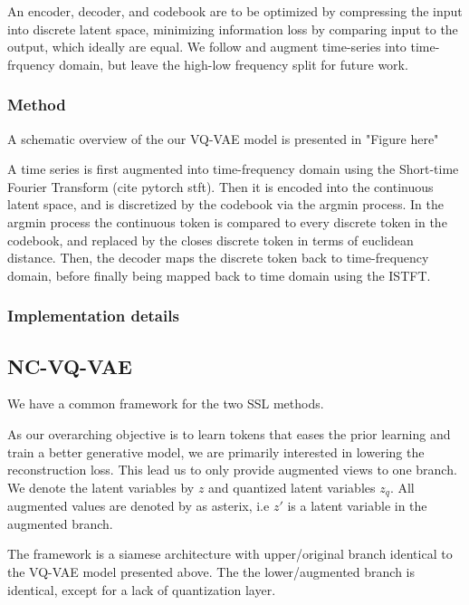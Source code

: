 \documentclass[../../thesis.tex]{subfiles}
\begin{document}
An encoder, decoder, and codebook are to be optimized by compressing the input into discrete latent space, minimizing information loss by comparing input to the output, which ideally are equal. We follow \cite{TimeVQVAE} and augment time-series into time-frquency domain, but leave the high-low frequency split for future work.

\subsubsection{Method}
A schematic overview of the our VQ-VAE model is presented in "Figure here"\newline

A time series is first augmented into time-frequency domain using the Short-time Fourier Transform (cite pytorch stft). Then it is encoded into the continuous latent space, and is discretized by the codebook via the argmin process. In the argmin process the continuous token is compared to every discrete token in the codebook, and replaced by the closes discrete token in terms of euclidean distance. Then, the decoder maps the discrete token back to time-frequency domain, before finally being mapped back to time domain using the ISTFT.




\subsubsection{Implementation details}


\subsection{NC-VQ-VAE}
We have a common framework for the two SSL methods.\newline

As our overarching objective is to learn tokens that eases the prior learning and train a better generative model, we are primarily interested in lowering the reconstruction loss. This lead us to only provide augmented views to one branch. We denote the latent variables by $z$ and quantized latent variables $z_q$. All augmented values are denoted by as asterix, i.e $z'$ is a latent variable in the augmented branch.\newline

The framework is a siamese architecture with upper/original branch identical to the VQ-VAE model presented above. The the lower/augmented branch is identical, except for a lack of quantization layer. \newline
\end{document}
